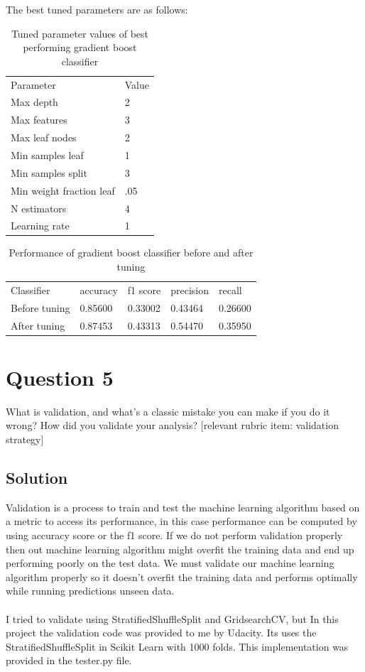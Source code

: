 \documentclass[12pt]{article}%
\begin{document}
The best tuned parameters are as follows:

\begin{table}[!htb]
\centering
\caption{Tuned parameter values of best performing gradient boost classifier}
\begin{tabular}{ll}
 Parameter & Value \\
 Max depth & 2 \\
 Max features & 3 \\
 Max leaf nodes & 2 \\
 Min samples leaf & 1 \\
 Min samples split & 3 \\
 Min weight fraction leaf & .05 \\
 N estimators & 4 \\
 Learning rate & 1 \\ 
 
\end{tabular}
\end{table}

\begin{table}[!htb]
\centering
\caption{Performance of gradient boost classifier before and after tuning }
\begin{tabular}{lllll}
 Classifier & accuracy & f1 score & precision & recall \\
 Before tuning & 0.85600 & 0.33002 & 0.43464 & 0.26600 \\
 After tuning & 0.87453 &  0.43313 & 0.54470 & 0.35950 \\ 
 
\end{tabular}
\end{table}


\section*{Question 5}
What is validation, and what’s a classic mistake you can make if you do it wrong? How did you validate your analysis?  [relevant rubric item: validation strategy]


\subsection*{Solution}

Validation is a process to train and test the machine learning algorithm based on a metric to access its performance, in this case performance can be computed by using accuracy score or the f1 score. If we do not perform validation properly then out machine learning algorithm might overfit the training data and end up performing poorly on the test data. We must validate our machine learning algorithm properly so it doesn't overfit the training data and performs optimally while running predictions unseen data.
\\
\\
I tried to validate using StratifiedShuffleSplit and GridsearchCV, but In this project the validation code was provided to me by Udacity. Its uses the StratifiedShuffleSplit in Scikit Learn with 1000 folds. This implementation was provided in the tester.py file.
\end{document}
